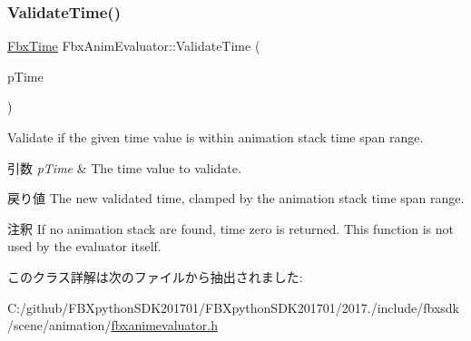 \subsubsection{\texorpdfstring{Validate\+Time()}{ValidateTime()}}
{\footnotesize\ttfamily \hyperlink{class_fbx_time}{Fbx\+Time} Fbx\+Anim\+Evaluator\+::\+Validate\+Time (\begin{DoxyParamCaption}\item[{const \hyperlink{class_fbx_time}{Fbx\+Time} \&}]{p\+Time }\end{DoxyParamCaption})}

Validate if the given time value is within animation stack time span range. 
\begin{DoxyParams}{引数}
{\em p\+Time} & The time value to validate. \\
\hline
\end{DoxyParams}
\begin{DoxyReturn}{戻り値}
The new validated time, clamped by the animation stack time span range. 
\end{DoxyReturn}
\begin{DoxyRemark}{注釈}
If no animation stack are found, time zero is returned. This function is not used by the evaluator itself. 
\end{DoxyRemark}


このクラス詳解は次のファイルから抽出されました\+:\begin{DoxyCompactItemize}
\item 
C\+:/github/\+F\+B\+Xpython\+S\+D\+K201701/\+F\+B\+Xpython\+S\+D\+K201701/2017./include/fbxsdk/scene/animation/\hyperlink{fbxanimevaluator_8h}{fbxanimevaluator.\+h}\end{DoxyCompactItemize}
